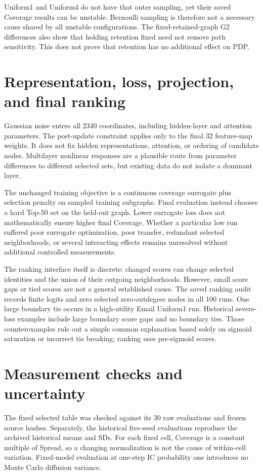 Uniform1 and Uniform4 do not have that outer sampling, yet their saved Coverage results can be unstable. Bernoulli sampling is therefore not a necessary cause shared by all unstable configurations. The fixed-retained-graph G2 differences also show that holding retention fixed need not remove path sensitivity. This does not prove that retention has no additional effect on PDP.

\section{Representation, loss, projection, and final ranking}
Gaussian noise enters all 2340 coordinates, including hidden-layer and attention parameters. The post-update constraint applies only to the final 32 feature-map weights. It does not fix hidden representations, attention, or ordering of candidate nodes. Multilayer nonlinear responses are a plausible route from parameter differences to different selected sets, but existing data do not isolate a dominant layer.

The unchanged training objective is a continuous coverage surrogate plus selection penalty on sampled training subgraphs. Final evaluation instead chooses a hard Top-50 set on the held-out graph. Lower surrogate loss does not mathematically ensure higher final Coverage. Whether a particular low run suffered poor surrogate optimization, poor transfer, redundant selected neighborhoods, or several interacting effects remains unresolved without additional controlled measurements.

The ranking interface itself is discrete: changed scores can change selected identities and the union of their outgoing neighborhoods. However, small score gaps or tied scores are not a general established cause. The saved ranking audit records finite logits and zero selected zero-outdegree nodes in all 100 runs. One large boundary tie occurs in a high-utility Email Uniform1 run. Historical severe-loss examples include large boundary score gaps and no boundary ties. Those counterexamples rule out a simple common explanation based solely on sigmoid saturation or incorrect tie breaking; ranking uses pre-sigmoid scores.

\section{Measurement checks and uncertainty}
The fixed selected table was checked against its 30 raw evaluations and frozen source hashes. Separately, the historical five-seed evaluations reproduce the archived historical means and SDs. For each fixed cell, Coverage is a constant multiple of Spread, so a changing normalization is not the cause of within-cell variation. Fixed-model evaluation at one-step IC probability one introduces no Monte Carlo diffusion variance.

